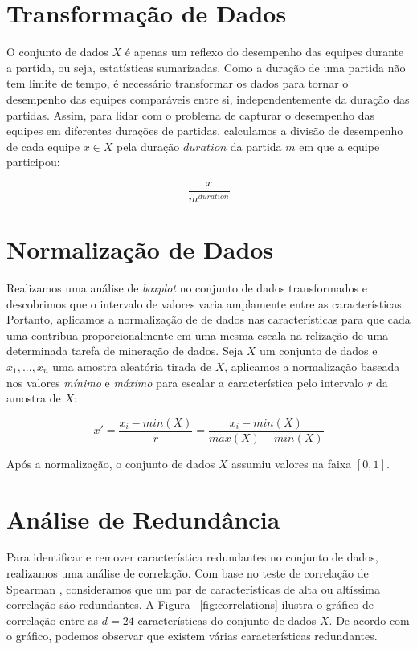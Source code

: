 \section{Transformação de Dados}
O conjunto de dados $X$ é apenas um reflexo do desempenho das equipes durante a partida, ou seja, estatísticas sumarizadas. Como a duração de uma partida não tem limite de tempo, é necessário transformar os dados para tornar o desempenho das equipes comparáveis entre si, independentemente da duração das partidas. Assim, para lidar com o problema de capturar o desempenho das equipes em diferentes durações de partidas, calculamos a divisão de desempenho de cada equipe $x \in X$ pela duração $duration$ da partida $m$ em que a equipe participou:

\begin{displaymath}
  \frac{x}{m^{duration}}
\end{displaymath}

\section{Normalização de Dados}
Realizamos uma análise de \textit{boxplot} no conjunto de dados transformados e descobrimos que o intervalo de valores varia amplamente entre as características. Portanto, aplicamos a normalização de de dados \cite{zaki2014data} nas características para que cada uma contribua proporcionalmente em uma mesma escala na relização de uma determinada tarefa de mineração de dados. Seja $X$ um conjunto de dados e $x_1, ..., x_n $ uma amostra aleatória tirada de $X$, aplicamos a normalização baseada nos valores \textit{mínimo} e \textit{máximo} para escalar a característica pelo intervalo $r$ da amostra de $X$:

\begin{displaymath}
  x'=\frac{x_i - min(X)}{r}=\frac{x_i - min(X)}{max(X)-min(X)}
\end{displaymath}

Após a normalização, o conjunto de dados $X$ assumiu valores na faixa $[0, 1]$.

\section{Análise de Redundância}

Para identificar e remover característica redundantes no conjunto de dados, realizamos uma análise de correlação. Com base no teste de correlação de Spearman \cite{xiao2015using}, consideramos que um par de características de alta ou altíssima correlação são redundantes. A Figura ~\ref{fig:correlations} ilustra o gráfico de correlação entre as $d=24$ características do conjunto de dados $X$. De acordo com o gráfico, podemos observar que existem várias características redundantes.

